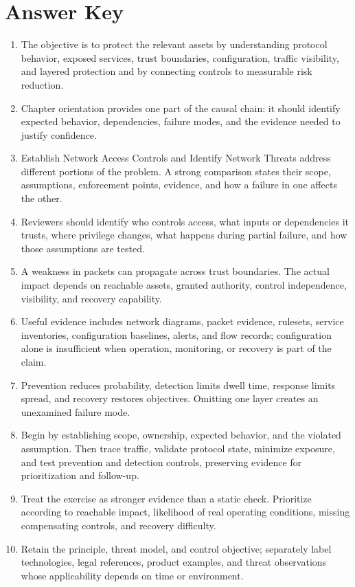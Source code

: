 \documentclass[11pt]{article}
\begin{document}
\section*{Answer Key}
\begin{enumerate}
\item The objective is to protect the relevant assets by understanding protocol behavior, exposed services, trust boundaries, configuration, traffic visibility, and layered protection and by connecting controls to measurable risk reduction.
\item Chapter orientation provides one part of the causal chain: it should identify expected behavior, dependencies, failure modes, and the evidence needed to justify confidence.
\item Establish Network Access Controls and Identify Network Threats address different portions of the problem. A strong comparison states their scope, assumptions, enforcement points, evidence, and how a failure in one affects the other.
\item Reviewers should identify who controls access, what inputs or dependencies it trusts, where privilege changes, what happens during partial failure, and how those assumptions are tested.
\item A weakness in packets can propagate across trust boundaries. The actual impact depends on reachable assets, granted authority, control independence, visibility, and recovery capability.
\item Useful evidence includes network diagrams, packet evidence, rulesets, service inventories, configuration baselines, alerts, and flow records; configuration alone is insufficient when operation, monitoring, or recovery is part of the claim.
\item Prevention reduces probability, detection limits dwell time, response limits spread, and recovery restores objectives. Omitting one layer creates an unexamined failure mode.
\item Begin by establishing scope, ownership, expected behavior, and the violated assumption. Then trace traffic, validate protocol state, minimize exposure, and test prevention and detection controls, preserving evidence for prioritization and follow-up.
\item Treat the exercise as stronger evidence than a static check. Prioritize according to reachable impact, likelihood of real operating conditions, missing compensating controls, and recovery difficulty.
\item Retain the principle, threat model, and control objective; separately label technologies, legal references, product examples, and threat observations whose applicability depends on time or environment.
\end{enumerate}
\end{document}
